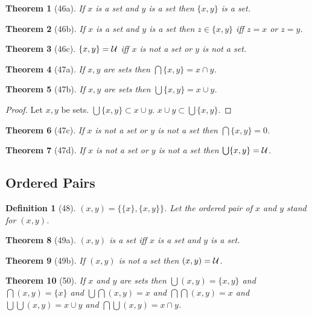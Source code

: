 \documentclass{scrartcl}
\newtheorem*{theorem}{Theorem}
\newtheorem*{definition}{Definition}
\newcommand{\sing}[1]{\{{#1}\}}
\newcommand{\pair}[2]{\{{#1},{#2}\}}
\newcommand{\op}[2]{({#1},{#2})}
\begin{document}
\begin{theorem}[46a] If $x$ is a set and $y$ is a set then $\pair{x}{y}$ is a set.
\end{theorem}
\begin{theorem}[46b] If $x$ is a set and $y$ is a set then
$z \in \pair{x}{y}$ iff $z=x$ or $z=y$.
\end{theorem}
\begin{theorem}[46c] $\pair{x}{y} = {\cal U}$ iff $x$ is not a set or $y$ 
is not a set.
\end{theorem}

\begin{theorem}[47a] If $x,y$ are sets then $\bigcap \pair{x}{y} = x \cap y$.
\end{theorem}
\begin{theorem}[47b] If $x,y$ are sets then $\bigcup \pair{x}{y} = x \cup y$.
\end{theorem}
\begin{proof} Let $x,y$ be sets.
$\bigcup \pair{x}{y} \subset x \cup y$.
$x \cup y \subset \bigcup \pair{x}{y}$.
\end{proof}
\begin{theorem}[47c] If $x$ is not a set or $y$ is not a set then
$\bigcap \pair{x}{y} = 0$.
\end{theorem}
\begin{theorem}[47d] If $x$ is not a set or $y$ is not a set then
$\bigcup \pair{x}{y} = {\cal U}$.
\end{theorem}


\subsection{Ordered Pairs}


\begin{definition}[48] $\op{x}{y} = \pair{\sing{x}}{\pair{x}{y}}$.
Let the \emph{ordered pair} of $x$ and $y$ stand for $\op{x}{y}$.
\end{definition}

\begin{theorem}[49a] $\op{x}{y}$ is a set iff $x$ is a set and $y$ is a set.
\end{theorem}

\begin{theorem}[49b] If $\op{x}{y}$ is not a set then $\op{x}{y} = {\cal U}$.
\end{theorem}

\begin{theorem}[50] If $x$ and $y$ are sets then 
  $\bigcup \op{x}{y} = \pair{x}{y}$ and   
  $\bigcap \op{x}{y} = \sing{x}$ and
  $\bigcup \bigcap \op{x}{y} = x$ and
  $\bigcap \bigcap \op{x}{y} = x$ and 
  $\bigcup \bigcup \op{x}{y} = x \cup y$ and
  $\bigcap \bigcup \op{x}{y} = x \cap y$.
\end{theorem}  
\end{document}
